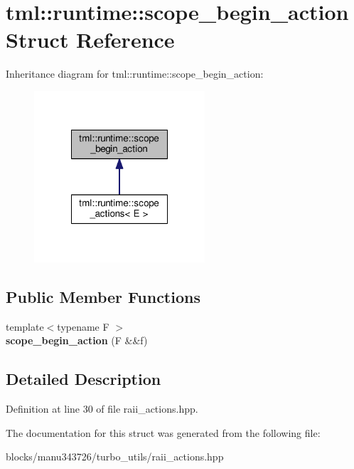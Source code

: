 \hypertarget{structtml_1_1runtime_1_1scope__begin__action}{\section{tml\+:\+:runtime\+:\+:scope\+\_\+begin\+\_\+action Struct Reference}
\label{structtml_1_1runtime_1_1scope__begin__action}
}


Inheritance diagram for tml\+:\+:runtime\+:\+:scope\+\_\+begin\+\_\+action\+:
\nopagebreak
\begin{figure}[H]
\begin{center}
\leavevmode
\includegraphics[width=180pt]{structtml_1_1runtime_1_1scope__begin__action__inherit__graph}
\end{center}
\end{figure}
\subsection*{Public Member Functions}
\begin{DoxyCompactItemize}
\item 
\hypertarget{structtml_1_1runtime_1_1scope__begin__action_a65836759e5f65262743edcd79300ac45}{{\footnotesize template$<$typename F $>$ }\\{\bfseries scope\+\_\+begin\+\_\+action} (F \&\&f)}\label{structtml_1_1runtime_1_1scope__begin__action_a65836759e5f65262743edcd79300ac45}

\end{DoxyCompactItemize}


\subsection{Detailed Description}


Definition at line 30 of file raii\+\_\+actions.\+hpp.



The documentation for this struct was generated from the following file\+:\begin{DoxyCompactItemize}
\item 
blocks/manu343726/turbo\+\_\+utils/raii\+\_\+actions.\+hpp\end{DoxyCompactItemize}
